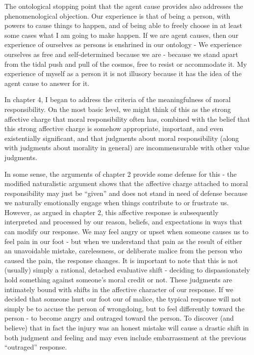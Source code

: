 \documentclass[phd,12pt,oneside,paper=letterpaper]{ubcthesis}
\begin{document}
The ontological stopping point that the agent cause provides also addresses the phenomenological objection. Our experience is that of being a person, with powers to cause things to happen, and of being able to freely choose in at least some cases what I am going to make happen. If we are agent causes, then our experience of ourselves as persons is enshrined in our ontology - We experience ourselves as free and self-determined because we are - because we stand apart from the tidal push and pull of the cosmos, free to resist or accommodate it. My experience of myself as a person it is not illusory because it has the idea of the agent cause to answer for it.

In chapter 4, I began to address the criteria of the meaningfulness of moral responsibility. On the most basic level, we might think of this as the strong affective charge that moral responsibility often has, combined with the belief that this strong affective charge is somehow appropriate, important, and even existentially significant, and that judgments about moral responsibility (along with judgments about morality in general) are incommensurable with other value judgments.

In some sense, the arguments of chapter 2 provide some defense for this - the modified naturalistic argument shows that the affective charge attached to moral responsibility may just be ``given'' and does not stand in need of defense because we naturally emotionally engage when things contribute to or frustrate us. However, as argued in chapter 2, this affective response is subsequently interpreted and processed by our reason, beliefs, and expectations in ways that can modify our response. We may feel angry or upset when someone causes us to feel pain in our foot - but when we understand that pain as the result of either an unavoidable mistake, carelessness, or deliberate malice from the person who caused the pain, the response changes. It is important to note that this is not (usually) simply a rational, detached evaluative shift - deciding to dispassionately hold something against someone's moral credit or not. These judgments are intimately bound with shifts in the affective character of our response. If we decided that someone hurt our foot our of malice, the typical response will not simply be to accuse the person of wrongdoing, but to feel differently toward the person - to become angry and outraged toward the person. To discover (and believe) that in fact the injury was an honest mistake will cause a drastic shift in both judgment and feeling and may even include embarrassment at the previous ``outraged'' response.
\end{document}

